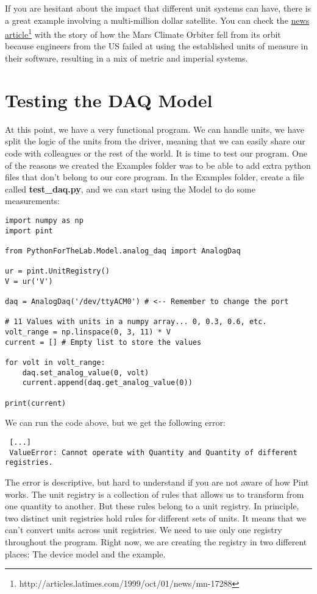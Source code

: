 If you are hesitant about the impact that different unit systems can have, there is a great example involving a multi-million dollar satellite. You can check the \href{http://articles.latimes.com/1999/oct/01/news/mn-17288}{news article}\footnote{http://articles.latimes.com/1999/oct/01/news/mn-17288} with the story of how the Mars Climate Orbiter fell from its orbit because engineers from the US failed at using the established units of measure in their software, resulting in a mix of metric and imperial systems.

\section{Testing the DAQ Model}\label{sec:testing-the-daq-model}
At this point, we have a very functional program. We can handle units, we have split the logic of the units from the driver, meaning that we can easily share our code with colleagues or the rest of the world. It is time to test our program. One of the reasons we created the Examples folder was to be able to add extra python files that don't belong to our core program. In the Examples folder, create a file called \textbf{test\_daq.py}, and we can start using the Model to do some measurements:

\begin{verbatim}
import numpy as np
import pint

from PythonForTheLab.Model.analog_daq import AnalogDaq

ur = pint.UnitRegistry()
V = ur('V')

daq = AnalogDaq('/dev/ttyACM0') # <-- Remember to change the port

# 11 Values with units in a numpy array... 0, 0.3, 0.6, etc.
volt_range = np.linspace(0, 3, 11) * V
current = [] # Empty list to store the values

for volt in volt_range:
    daq.set_analog_value(0, volt)
    current.append(daq.get_analog_value(0))

print(current)
\end{verbatim}

We can run the code above, but we get the following error:

\begin{verbatim}
 [...]
 ValueError: Cannot operate with Quantity and Quantity of different registries.
\end{verbatim}

The error is descriptive, but hard to understand if you are not aware of how Pint works. The unit registry is a collection of rules that allows us to transform from one quantity to another. But these rules belong to a unit registry. In principle, two distinct unit registries hold rules for different sets of units. It means that we can't convert units across unit registries. We need to use only one registry throughout the program. Right now, we are creating the registry in two different places: The device model and the example.

